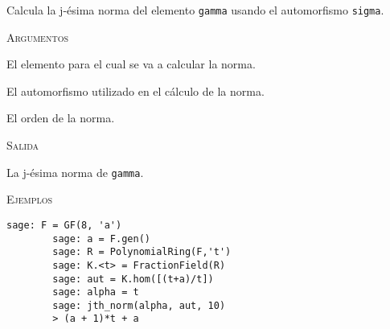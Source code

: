 \begin{description}[leftmargin=1em, font=\ttfamily, style=nextline]

    \item[jth\_norm(gamma, sigma, j)]
    
    Calcula la j-ésima norma del elemento \texttt{gamma} usando el automorfismo \texttt{sigma}.

    \textsc{Argumentos}

    \begin{description}[font=\normalfont\ttfamily]
        \item[gamma] El elemento para el cual se va a calcular la norma.
        \item[sigma] El automorfismo utilizado en el cálculo de la norma.
        \item[j] El orden de la norma.
    \end{description}

    \textsc{Salida}

    \begin{description}[font=\normalfont\ttfamily]
        \item[] La j-ésima norma de \texttt{gamma}.
    \end{description}

    \textsc{Ejemplos}

    \begin{lstlisting}[gobble=8]
        sage: F = GF(8, 'a')
        sage: a = F.gen()
        sage: R = PolynomialRing(F,'t')
        sage: K.<t> = FractionField(R)
        sage: aut = K.hom([(t+a)/t])
        sage: alpha = t
        sage: jth_norm(alpha, aut, 10)
        > (a + 1)*t + a
    \end{lstlisting}     
\end{description}

